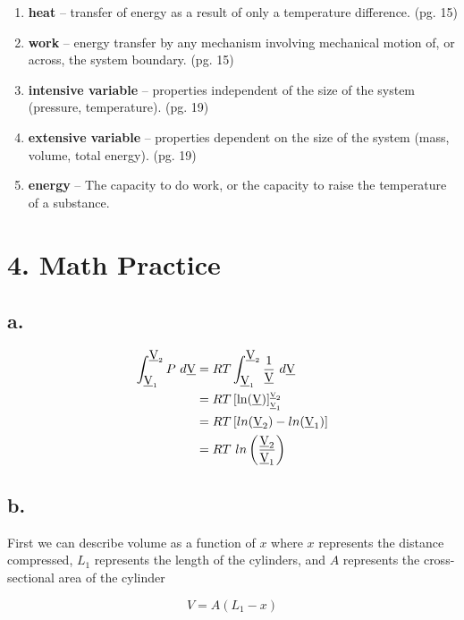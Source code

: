 \documentclass{article}
\begin{document}
\begin{enumerate}[label= (\alph*)]
    \item \textbf{heat} -- transfer of energy as a result of only a temperature difference. (pg. 15)
    \item \textbf{work} -- energy transfer by any mechanism involving mechanical motion of, or across, the system boundary. (pg. 15)
    \item \textbf{intensive variable} -- properties independent of the size of the system (pressure, temperature). (pg. 19)
    \item \textbf{extensive variable} -- properties dependent on the size of the system (mass, volume, total energy). (pg. 19)
    \item \textbf{energy} -- The capacity to do work, or the capacity to raise the temperature of a substance.
\end{enumerate}

\pagebreak

\section*{4. Math Practice}

\subsection*{a.}

\begin{align*}
  \int_{\underbar{V}_1}^{\underbar{V}_2} P \ d\underbar{V} &= RT \int_{\underbar{V}_1}^{\underbar{V}_2} \frac{1}{\underbar{V}} \ d\underbar{V} \\
  &= RT \left[ \ln(\underbar{V}) \right]_{\tiny \underbar{V}_1}^{ \tiny \underbar{V}_2} \\
  &= RT \left[ ln(\underbar{V}_2) - ln(\underbar{V}_1) \right] \\
  &= RT \ ln\left(\frac{\underbar{V}_2}{\underbar{V}_1}\right) \\
\end{align*}

\subsection*{b.}
\indent

First we can describe volume as a function of $x$ where $x$ represents the distance compressed, $L_1$ represents the length of the cylinders, and $A$ represents the cross-sectional area of the cylinder

$$
  V = A \left( L_1 - x \right)
$$
\end{document}
